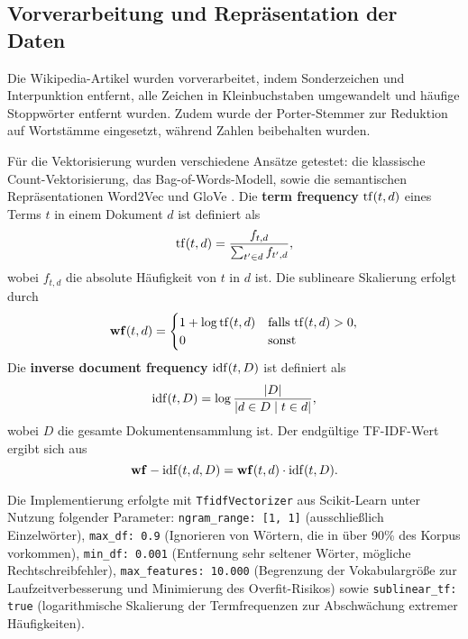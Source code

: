 \subsection{Vorverarbeitung und Repräsentation der Daten}
\label{sec:vorverarbeitung}

Die Wikipedia-Artikel wurden vorverarbeitet, indem Sonderzeichen und Interpunktion entfernt, alle Zeichen in Kleinbuchstaben umgewandelt und häufige Stoppwörter entfernt wurden. Zudem wurde der Porter-Stemmer \cite{Porter2006} zur Reduktion auf Wortstämme eingesetzt, während Zahlen beibehalten wurden.

Für die Vektorisierung wurden verschiedene Ansätze getestet: die klassische Count-Vektorisierung, das Bag-of-Words-Modell, sowie die semantischen Repräsentationen Word2Vec \cite{Mikolov2013} und GloVe \cite{Pennington2014}. Die \textbf{term frequency} $\mathrm{tf}(t, d)$ eines Terms $t$ in einem Dokument $d$ ist definiert als
\begin{equation*}
    \mathrm{tf}(t, d) = \frac{f_{t, d}}{\sum_{t'\in d}f_{t', d}},
\end{equation*}
wobei $f_{t, d}$ die absolute Häufigkeit von $t$ in $d$ ist. Die sublineare Skalierung erfolgt durch
\begin{equation*}
    \mathbf{wf}(t, d) = \begin{cases}
        1 + \log \mathrm{tf}(t, d) &\text{falls } \mathrm{tf}(t, d) > 0,\\
        0 &\text{sonst}
    \end{cases}
\end{equation*}
Die \textbf{inverse document frequency} $\mathrm{idf}(t, D)$ ist definiert als
\begin{equation*}
    \mathrm{idf}(t, D) = \log\frac{\vert D\vert}{\vert{d\in D \mid t\in d}\vert},
\end{equation*}
wobei $D$ die gesamte Dokumentensammlung ist. Der endgültige TF-IDF-Wert ergibt sich aus
\begin{equation*}
    \mathbf{wf}-\mathrm{idf}(t, d, D) = \mathbf{wf}(t, d)\cdot \mathrm{idf}(t, D).
\end{equation*}

Die Implementierung erfolgte mit \texttt{TfidfVectorizer} aus Scikit-Learn \cite{Pedregosa2011} unter Nutzung folgender Parameter: \texttt{ngram\_range: [1, 1]} (ausschließlich Einzelwörter), \texttt{max\_df: 0.9} (Ignorieren von Wörtern, die in über 90\% des Korpus vorkommen), \texttt{min\_df: 0.001} (Entfernung sehr seltener Wörter, mögliche Rechtschreibfehler), \texttt{max\_features: 10.000} (Begrenzung der Vokabulargröße zur Laufzeitverbesserung und Minimierung des Overfit-Risikos) sowie \texttt{sublinear\_tf: true} (logarithmische Skalierung der Termfrequenzen zur Abschwächung extremer Häufigkeiten).